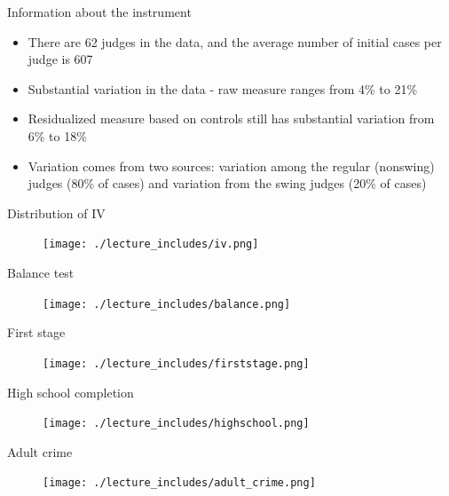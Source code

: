 \documentclass{beamer}
\begin{document}
\begin{frame}{Information about the instrument}

\begin{itemize}
	\item There are 62 judges in the data, and the average number of initial cases per judge is 607
	\item Substantial variation in the data - raw measure ranges from 4\% to 21\%
	\item Residualized measure based on controls still has substantial variation from 6\% to 18\%
	\item Variation comes from two sources: variation among the regular (nonswing) judges (80\% of cases) and variation from the swing judges (20\% of cases)
\end{itemize}

\end{frame}

\begin{frame}{Distribution of IV}
	
	\begin{figure}
	\texttt{[image: ./lecture\_includes/iv.png]}
	\end{figure}
\end{frame}
	
\begin{frame}{Balance test}
	
	\begin{figure}
	\texttt{[image: ./lecture\_includes/balance.png]}
	\end{figure}
\end{frame}

\begin{frame}{First stage}
	
	\begin{figure}
	\texttt{[image: ./lecture\_includes/firststage.png]}
	\end{figure}
\end{frame}


\begin{frame}{High school completion}
	
	\begin{figure}
	\texttt{[image: ./lecture\_includes/highschool.png]}
	\end{figure}
\end{frame}


\begin{frame}{Adult crime}
	
	\begin{figure}
	\texttt{[image: ./lecture\_includes/adult\_crime.png]}
	\end{figure}
\end{frame}
\end{document}
